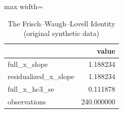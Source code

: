 \begin{table}[htbp]
\centering
\caption{The Frisch–Waugh–Lovell Identity (original synthetic data)}
\begingroup
\small
\setlength{\tabcolsep}{6pt}
\renewcommand{\arraystretch}{1.12}
\begin{adjustbox}{max width=\linewidth}
\begin{tabular}{@{}lr@{}}
\toprule
 & value \\
\midrule
full\_x\_slope & 1.188234 \\
residualized\_x\_slope & 1.188234 \\
full\_x\_hc3\_se & 0.111878 \\
observations & 240.000000 \\
\bottomrule
\end{tabular}
\end{adjustbox}
\endgroup
\end{table}